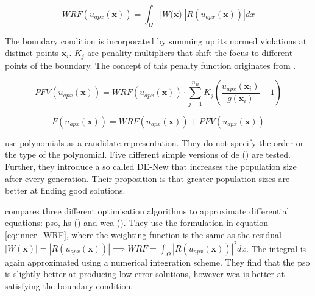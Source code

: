 \documentclass[./\jobname.tex]{subfiles}
\begin{document}
\begin{equation}
\label{eq:inner_WRF}
WRF(u_{apx}(\mathbf{x})) = \int_{\Omega} |W(\mathbf{x)}| |R(u_{apx}(\mathbf{x}))| dx
\end{equation} 

The boundary condition is incorporated by summing up its normed violations at distinct points $\mathbf{x}_i$. $K_j$ are penality multipliers that shift the focus to different points of the boundary. The concept of this penalty function originates from \cite{rajeev_discrete_1992}.

\begin{equation}
\label{eq:boundary_penalty}
PFV(u_{apx}(\mathbf{x})) = WRF(u_{apx}(\mathbf{x})) \cdot \sum_{j=1}^{n_B} K_j \left(\frac{u_{apx}(\mathbf{x}_i)}{g(\mathbf{x}_i)} - 1\right)
\end{equation}

\begin{equation}
\label{eq:inner_and_boundary_fitness}
F(u_{apx}(\mathbf{x})) = WRF(u_{apx}(\mathbf{x})) + PFV(u_{apx}(\mathbf{x}))
\end{equation}

\cite{panagant_solving_2014} use polynomials as a candidate representation. They do not specify the order or the type of the polynomial. Five different simple versions of \gls{de} (\cite{storn_differential_1997}) are tested. Further, they introduce a so called DE-New that increases the population size after every generation. Their proposition is that greater population sizes are better at finding good solutions. 

\cite{sadollah_metaheuristic_2017} compares three different optimisation algorithms to approximate differential equations: \gls{pso}, \gls{hs} (\cite{geem_new_2001}) and \gls{wca} (\cite{eskandar_water_2012}). They use the formulation in equation \eqref{eq:inner_WRF}, where the weighting function is the same as the residual $|W(\mathbf{x})| = |R(u_{apx}(\mathbf{x}))| \implies WRF = \int_{\Omega} |R(u_{apx}(\mathbf{x}))|^2 dx$. The integral is again approximated using a numerical integration scheme. They find that the \gls{pso} is slightly better at producing low error solutions, however \gls{wca} is better at satisfying the boundary condition. 
\end{document}
